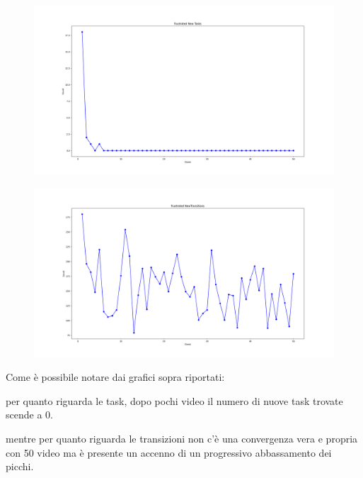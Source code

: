 \begin{figure}
    \centering   
    \includegraphics[width=1\linewidth]{images/frustrated New Tasks.png}
\end{figure}
\begin{figure}
    \centering   
    \includegraphics[width=1\linewidth]{images/frustrated NewTransitions.png}
\end{figure}\clearpage

Come è possibile notare dai grafici sopra riportati:

per quanto riguarda le task, dopo pochi video il numero di nuove task trovate scende a 0.

mentre per quanto riguarda le transizioni non c’è una convergenza vera e propria con 50 video ma è presente un accenno di un progressivo abbassamento dei picchi.

